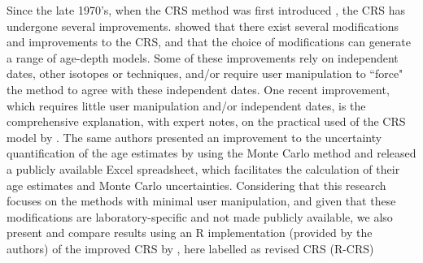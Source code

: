 \documentclass [10pt] {article}
\begin{document}

Since the late 1970's, when the CRS method was first introduced \citep{Appleby1978,Robbins1978}, the CRS has undergone several improvements.
\citet{Barsanti2020} showed that there exist several modifications and improvements to the CRS, and that the choice of modifications can generate a range of age-depth models.
Some of these improvements rely on independent dates, other isotopes or techniques, and/or require user manipulation to ``force" the method to agree with these independent dates.
One recent improvement, which requires little user manipulation and/or independent dates, is the comprehensive explanation, with expert notes, on the practical used of the CRS model by \citet{Sanchez-Cabeza2012}. 
The same authors presented an improvement to the uncertainty quantification of the age estimates by using the Monte Carlo method \citep{Sanchez-Cabeza2014} and released a publicly available Excel spreadsheet, which facilitates the calculation of their age estimates and Monte Carlo uncertainties. 
Considering that this research focuses on the methods with minimal user manipulation, and given that these modifications are laboratory-specific and not made publicly available, we also present and compare results using an R implementation (provided by the authors) of the improved CRS by \citet{Sanchez-Cabeza2014}, here labelled as revised CRS (R-CRS)


\end{document}
